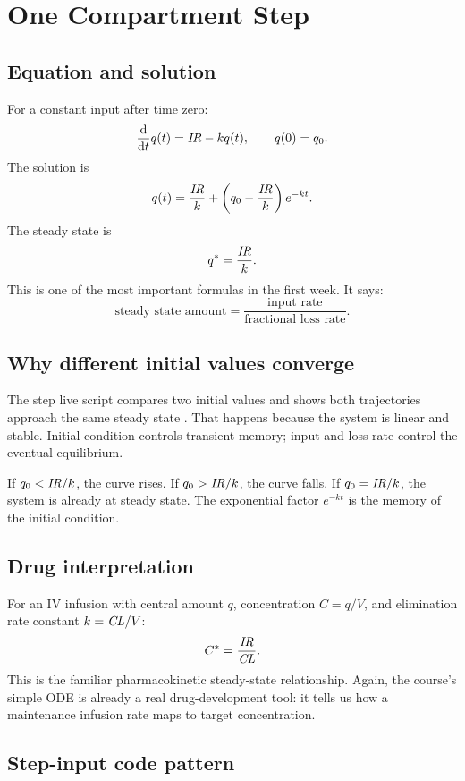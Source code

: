 \documentclass[a4paper]{article}
\newcommand{\ddt}{\frac{\dd}{\dd t}}
\newcommand{\CL}{\ensuremath{\pksym{CL}}}
\newcommand{\IRate}{\ensuremath{\pksym{IR}}}
\begin{document}
\section{One Compartment Step}

\subsection{Equation and solution}

For a constant input after time zero:
\[
  \ddt q(t)=\IRate-kq(t),\qquad q(0)=q_0.
\]
The solution is
\[
  q(t)=\frac{\IRate}{k}
  +
  \left(q_0-\frac{\IRate}{k}\right)e^{-kt}.
\]
The steady state is
\[
  q^*=\frac{\IRate}{k}.
\]
This is one of the most important formulas in the first week. It says:
\[
  \text{steady state amount}
  =
  \frac{\text{input rate}}{\text{fractional loss rate}}.
\]

\subsection{Why different initial values converge}

The step live script compares two initial values and shows both trajectories approach the same steady state \cite{bmeg671MatlabStep2025}. That happens because the system is linear and stable. Initial condition controls transient memory; input and loss rate control the eventual equilibrium.

If \(q_0<\IRate/k\), the curve rises. If \(q_0>\IRate/k\), the curve falls. If \(q_0=\IRate/k\), the system is already at steady state. The exponential factor \(e^{-kt}\) is the memory of the initial condition.

\subsection{Drug interpretation}

For an IV infusion with central amount \(q\), concentration \(C=q/V\), and elimination rate constant \(k=\CL/V\):
\[
  C^*=\frac{\IRate}{\CL}.
\]
This is the familiar pharmacokinetic steady-state relationship. Again, the course's simple ODE is already a real drug-development tool: it tells us how a maintenance infusion rate maps to target concentration.

\subsection{Step-input code pattern}
\end{document}
